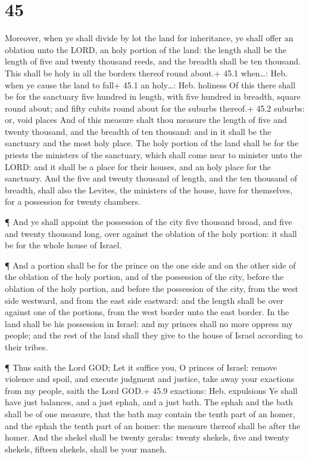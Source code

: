 \hypertarget{section-44}{%
\section{45}\label{section-44}}

 Moreover, when ye shall divide by lot the land for
inheritance, ye shall offer an oblation unto the LORD, an holy portion
of the land: the length shall be the length of five and twenty thousand
reeds, and the breadth shall be ten thousand. This shall be holy in all
the borders thereof round about.+ 45.1 when\ldots: Heb. when ye cause
the land to fall+ 45.1 an holy\ldots: Heb. holiness  Of this
there shall be for the sanctuary five hundred in length, with five
hundred in breadth, square round about; and fifty cubits round about for
the suburbs thereof.+ 45.2 suburbs: or, void places  And of
this measure shalt thou measure the length of five and twenty thousand,
and the breadth of ten thousand: and in it shall be the sanctuary and
the most holy place.  The holy portion of the land shall be
for the priests the ministers of the sanctuary, which shall come near to
minister unto the LORD: and it shall be a place for their houses, and an
holy place for the sanctuary.  And the five and twenty
thousand of length, and the ten thousand of breadth, shall also the
Levites, the ministers of the house, have for themselves, for a
possession for twenty chambers.

 ¶ And ye shall appoint the possession of the city five
thousand broad, and five and twenty thousand long, over against the
oblation of the holy portion: it shall be for the whole house of Israel.

 ¶ And a portion shall be for the prince on the one side and
on the other side of the oblation of the holy portion, and of the
possession of the city, before the oblation of the holy portion, and
before the possession of the city, from the west side westward, and from
the east side eastward: and the length shall be over against one of the
portions, from the west border unto the east border.  In the
land shall be his possession in Israel: and my princes shall no more
oppress my people; and the rest of the land shall they give to the house
of Israel according to their tribes.

 ¶ Thus saith the Lord GOD; Let it suffice you, O princes of
Israel: remove violence and spoil, and execute judgment and justice,
take away your exactions from my people, saith the Lord GOD.+ 45.9
exactions: Heb. expulsions  Ye shall have just balances,
and a just ephah, and a just bath.  The ephah and the bath
shall be of one measure, that the bath may contain the tenth part of an
homer, and the ephah the tenth part of an homer: the measure thereof
shall be after the homer.  And the shekel shall be twenty
gerahs: twenty shekels, five and twenty shekels, fifteen shekels, shall
be your maneh.

